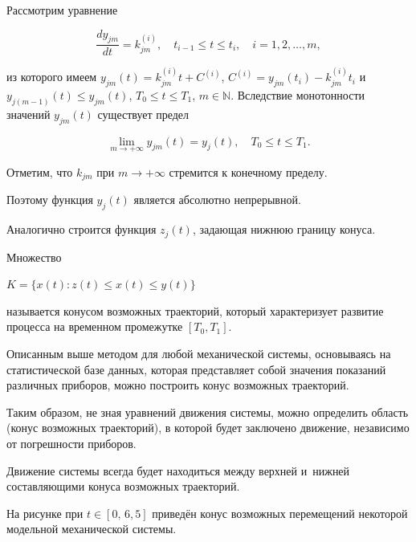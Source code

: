 Рассмотрим уравнение

$$

\frac{dy_{jm}}{dt}=k_{jm}^{(i)},


\quad  t_{i-1} \leqslant t \leqslant t_i, \quad i=1, 2, \dots, m,

$$

из которого имеем $y_{jm}(t)=k_{jm}^{(i)}t+C^{(i)}$, $C^{(i)}=y_{jm}(t_i)-k_{jm}^{(i)}t_i$ и $y_{j(m-1)}(t)\leqslant y_{jm}(t)$, $T_0\leqslant t \leqslant T_1$, $m\in \mathbb N$. Вследствие монотонности значений $y_{jm}(t)$ существует предел

$$

\lim_{m\to+\infty}y_{jm}(t)=y_j(t),\quad  T_0\leqslant t\leqslant T_1.

$$

Отметим, что $k_{jm}$ при $m\to+\infty$ стремится к конечному пределу.

Поэтому функция $y_j(t)$ является абсолютно непрерывной.



Аналогично строится функция $z_j(t)$, задающая нижнюю границу конуса.



Множество

$

K=\{x(t): z(t)\leqslant x(t)\leqslant y(t)\}

$

называется конусом возможных траекторий, который характеризует развитие процесса на временном промежутке $ [T_0, T_1] $.



Описанным выше методом для любой механической системы, основываясь на статистической базе данных, которая представляет собой значения показаний различных приборов, можно построить конус возможных траекторий.

Таким образом, не зная уравнений движения системы, можно определить область (конус возможных траекторий), в которой будет заключено движение, независимо от погрешности приборов.

Движение системы всегда будет находиться между верхней и~нижней составляющими конуса возможных траекторий.

На рисунке при $t\in [0,\, 6,5]$ приведён конус возможных перемещений некоторой модельной механической системы.








